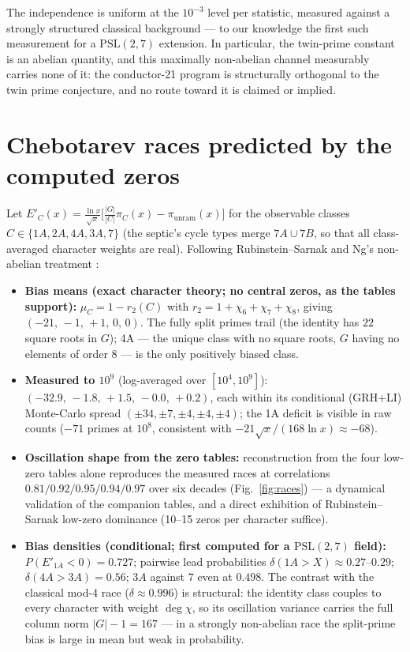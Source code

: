 \documentclass[11pt]{article}
\begin{document}
The independence is uniform at the $10^{-3}$ level per statistic, measured
against a strongly structured classical background --- to our knowledge the
first such measurement for a $\mathrm{PSL}(2,7)$ extension. In particular,
the twin-prime constant is an abelian quantity, and this maximally
non-abelian channel measurably carries none of it: the conductor-21 program
is structurally orthogonal to the twin prime conjecture, and no route toward
it is claimed or implied.

\section{Chebotarev races predicted by the computed zeros}\label{sec:races}
Let $E'_C(x)=\frac{\ln x}{\sqrt x}\bigl[\frac{|G|}{|C|}\pi_C(x)-
\pi_{\mathrm{unram}}(x)\bigr]$ for the observable classes
$C\in\{1A,2A,4A,3A,7\}$ (the septic's cycle types merge $7A\cup7B$, so that
all class-averaged character weights are real). Following Rubinstein--Sarnak
\cite{rs} and Ng's non-abelian treatment \cite{ng}:

\begin{itemize}
\item \textbf{Bias means (exact character theory; no central zeros, as the
tables support):} $\mu_C=1-r_2(C)$ with $r_2=1+\chi_6+\chi_7+\chi_8$, giving
$(-21,\,-1,\,+1,\,0,\,0)$. The fully split primes trail (the identity has
$22$ square roots in $G$); 4A --- the unique class with no square roots, $G$
having no elements of order 8 --- is the only positively biased class.
\item \textbf{Measured to $10^9$} (log-averaged over $[10^4,10^9]$):
$(-32.9,\,-1.8,\,+1.5,\,-0.0,\,+0.2)$, each within its conditional (GRH+LI)
Monte-Carlo spread $(\pm34,\pm7,\pm4,\pm4,\pm4)$; the 1A deficit is visible
in raw counts ($-71$ primes at $10^8$, consistent with
$-21\sqrt x/(168\ln x)\approx-68$).
\item \textbf{Oscillation shape from the zero tables:} reconstruction from
the four low-zero tables alone reproduces the measured races at correlations
$0.81/0.92/0.95/0.94/0.97$ over six decades (Fig.~\ref{fig:races}) --- a
dynamical validation of the companion tables, and a direct exhibition of
Rubinstein--Sarnak low-zero dominance (10--15 zeros per character suffice).
\item \textbf{Bias densities (conditional; first computed for a
$\mathrm{PSL}(2,7)$ field):} $P(E'_{1A}<0)=0.727$; pairwise lead
probabilities $\delta(1A\!>\!X)\approx0.27$--$0.29$; $\delta(4A\!>\!3A)=0.56$;
$3A$ against $7$ even at $0.498$. The contrast with the classical mod-4 race
($\delta\approx0.996$) is structural: the identity class couples to every
character with weight $\deg\chi$, so its oscillation variance carries the
full column norm $|G|-1=167$ --- in a strongly non-abelian race the
split-prime bias is large in mean but weak in probability.
\end{itemize}
\end{document}
